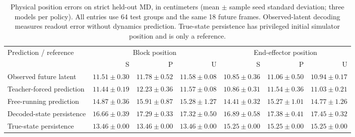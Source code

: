 \begin{table}[t]
\centering
\caption{Physical position errors on strict held-out MD, in centimeters (mean $\pm$ sample seed standard deviation; three models per policy). All entries use 64 test groups and the same 18 future frames. Observed-latent decoding measures readout error without dynamics prediction. True-state persistence has privileged initial simulator position and is only a reference.}
\label{tab:physical}
\footnotesize
\setlength{\tabcolsep}{5pt}
\renewcommand{\arraystretch}{1.12}
\begin{tabular}{lrrrrrr}
\toprule
Prediction / reference & \multicolumn{3}{c}{Block position} & \multicolumn{3}{c}{End-effector position} \\ & S & P & U & S & P & U \\
\midrule
Observed future latent & $11.51\pm0.30$ & $11.78\pm0.52$ & $11.58\pm0.08$ & $10.85\pm0.36$ & $11.06\pm0.50$ & $10.94\pm0.17$ \\
Teacher-forced prediction & $11.44\pm0.19$ & $12.23\pm0.36$ & $11.57\pm0.08$ & $10.86\pm0.31$ & $11.54\pm0.36$ & $11.03\pm0.21$ \\
Free-running prediction & $14.87\pm0.36$ & $15.91\pm0.87$ & $15.28\pm1.27$ & $14.41\pm0.32$ & $15.27\pm1.01$ & $14.77\pm1.26$ \\
Decoded-state persistence & $16.66\pm0.39$ & $17.29\pm0.33$ & $17.32\pm0.50$ & $16.89\pm0.58$ & $17.38\pm0.41$ & $17.45\pm0.32$ \\
True-state persistence & $13.46\pm0.00$ & $13.46\pm0.00$ & $13.46\pm0.00$ & $15.25\pm0.00$ & $15.25\pm0.00$ & $15.25\pm0.00$ \\
\bottomrule
\end{tabular}
\end{table}
